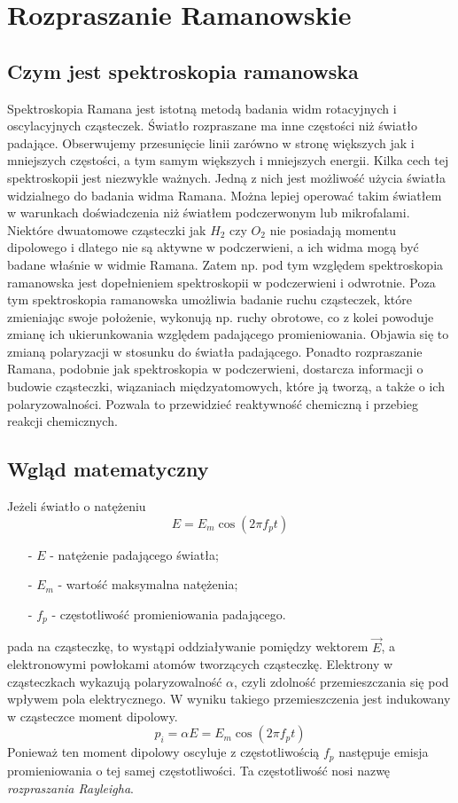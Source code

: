 \newpage

\section{Rozpraszanie Ramanowskie}
\subsection{Czym jest spektroskopia ramanowska}
Spektroskopia Ramana jest istotną metodą badania widm rotacyjnych i oscylacyjnych cząsteczek. Światło rozpraszane ma inne częstości niż światło padające. Obserwujemy przesunięcie linii zarówno w stronę większych jak i mniejszych częstości, a tym samym większych i mniejszych energii. Kilka cech tej spektroskopii jest niezwykle ważnych. Jedną z nich jest możliwość użycia światła widzialnego do badania widma Ramana. Można lepiej operować takim światłem w warunkach doświadczenia niż światłem podczerwonym lub mikrofalami. Niektóre dwuatomowe cząsteczki jak $H_{2}$ czy $O_{2}$ nie posiadają momentu dipolowego i dlatego nie są aktywne w podczerwieni, a ich widma mogą być badane właśnie w widmie Ramana. Zatem np. pod tym względem spektroskopia ramanowska jest dopełnieniem spektroskopii w podczerwieni i odwrotnie. Poza tym spektroskopia ramanowska umożliwia badanie ruchu cząsteczek, które zmieniając swoje położenie, wykonują np. ruchy obrotowe, co z kolei powoduje zmianę ich ukierunkowania względem padającego promieniowania. Objawia się to zmianą polaryzacji w stosunku do światła padającego. Ponadto rozpraszanie Ramana, podobnie jak spektroskopia w podczerwieni, dostarcza informacji o budowie cząsteczki, wiązaniach międzyatomowych, które ją tworzą, a także o ich polaryzowalności. Pozwala to przewidzieć reaktywność chemiczną i przebieg reakcji chemicznych.

\subsection{Wgląd matematyczny}
Jeżeli światło o natężeniu 
\begin{equation}
	E = E_{m}\cos (2\pi f_{p}t)
\end{equation}
\begin{itemize}
	\item[-]{$E$ - natężenie padającego światła};
	\item[-]{$E_{m}$ - wartość maksymalna natężenia};
	\item[-]{$f_{p}$ - częstotliwość promieniowania padającego}.
\end{itemize}
pada na cząsteczkę, to wystąpi oddziaływanie pomiędzy wektorem $\overrightarrow{E}$, a elektronowymi powłokami atomów tworzących cząsteczkę.
Elektrony w cząsteczkach wykazują polaryzowalność $\alpha$, czyli zdolność przemieszczania
się pod wpływem pola elektrycznego. W wyniku takiego przemieszczenia jest indukowany w cząsteczce moment dipolowy.
\begin{equation}
	p_{i} = \alpha E = E_{m}\cos (2\pi f_{p}t)
\end{equation}
Ponieważ ten moment dipolowy oscyluje z częstotliwością $f_{p}$ następuje emisja promieniowania o tej samej częstotliwości. Ta częstotliwość nosi nazwę 
\textit{rozpraszania Rayleigha}.

